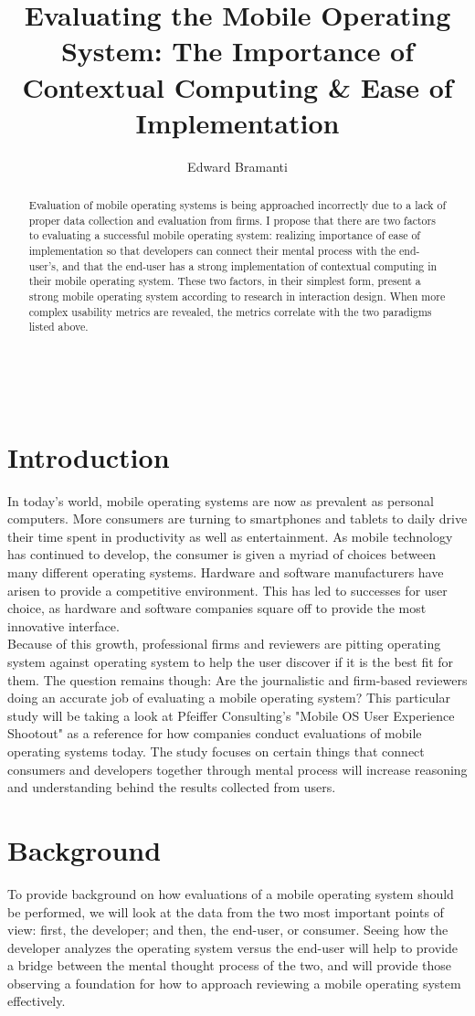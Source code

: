 \documentclass[11pt]{article}
\title{Evaluating the Mobile Operating System: The Importance of Contextual Computing \& Ease of Implementation}
\author{Edward Bramanti}
\begin{document}
\maketitle\
\begin{abstract}
Evaluation of mobile operating systems is being approached incorrectly due to a lack of proper data collection and evaluation from firms. I propose that there are two factors to evaluating a successful mobile operating system: realizing importance of ease of implementation so that developers can connect their mental process with the end-user's, and that the end-user has a strong implementation of contextual computing in their mobile operating system. These two factors, in their simplest form, present a strong mobile operating system according to research in interaction design. When more complex usability metrics are revealed, the metrics correlate with the two paradigms listed above.
\end{abstract}
\pagebreak
\section{Introduction}
In today's world, mobile operating systems are now as prevalent as personal computers. More consumers are turning to smartphones and tablets to daily drive their time spent in productivity as well as entertainment. As mobile technology has continued to develop, the consumer is given a myriad of choices between many different operating systems. Hardware and software manufacturers have arisen to provide a competitive environment. This has led to successes for user choice, as hardware and software companies square off to provide the most innovative interface.\\
\indent Because of this growth, professional firms and reviewers are pitting operating system against operating system to help the user discover if it is the best fit for them. The question remains though: Are the journalistic and firm-based reviewers doing an accurate job of evaluating a mobile operating system? This particular study will be taking a look at Pfeiffer Consulting's "Mobile OS User Experience Shootout" as a reference for how companies conduct evaluations of mobile operating systems today. The study focuses on certain things that connect consumers and developers together through mental process will increase reasoning and understanding behind the results collected from users.

\section{Background}
\label{background}
To provide background on how evaluations of a mobile operating system should be performed, we will look at the data from the two most important points of view: first, the developer; and then, the end-user, or consumer. Seeing how the developer analyzes the operating system versus the end-user will help to provide a bridge between the mental thought process of the two, and will provide those observing a foundation for how to approach reviewing a mobile operating system effectively.
\end{document}

